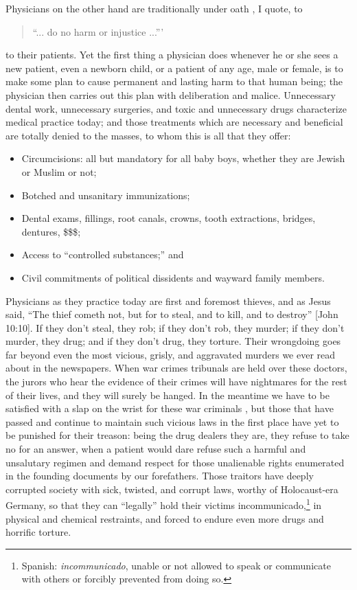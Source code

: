 \documentclass[letterpaper]{article}
\begin{document}
Physicians on the other hand are traditionally under oath \cite{north2002hippocratic}, I quote, to
\begin{quote}
``... do no harm or injustice ...''' 
\end{quote}
to their patients.  Yet the first thing a physician does whenever he or she sees a new patient, even a newborn child, or a patient of any age, male or female, is to make some plan to cause permanent and lasting harm to that human being; the physician then carries out this plan with deliberation and malice.  Unnecessary dental work, unnecessary surgeries, and toxic and unnecessary drugs characterize medical practice today; and those treatments which are necessary and beneficial are totally denied to the masses, to whom this is all that they offer:
\begin{itemize}
\itemsep0em
\item Circumcisions: all but mandatory for all baby boys, whether they are Jewish or Muslim or not;
\item Botched and unsanitary immunizations;
\item Dental exams, fillings, root canals, crowns, tooth extractions, bridges, dentures, \$\$\$;
\item Access to ``controlled substances;'' and
\item Civil commitments of political dissidents and wayward family members.
\end{itemize}
Physicians as they practice today are first and foremost thieves, and as Jesus said, ``The thief cometh not, but for to steal, and to kill, and to destroy'' [John 10:10].  If they don't steal, they rob; if they don't rob, they murder; if they don't murder, they drug; and if they don't drug, they torture.  Their wrongdoing goes far beyond even the most vicious, grisly, and aggravated murders we ever read about in the newspapers.  When war crimes tribunals are held over these doctors, the jurors who hear the evidence of their crimes will have nightmares for the rest of their lives, and they will surely be hanged.  In the meantime we have to be satisfied with a slap on the wrist for these war criminals \cite{osullivan2016western}, but those that have passed and continue to maintain such vicious laws  \cite[etc.]{rcw-10.77,rcw-71,rcw-72.06,rcw-72.23,rcw-72.27,rcw-72.25,rcw-72.29,rcw-37.12.010.4,bigfoot1969,bigfoot1984} in the first place have yet to be punished for their treason:  being the drug dealers they are, they refuse to take no for an answer, when a patient would dare refuse such a harmful and unsalutary regimen and demand respect for those unalienable rights enumerated in the founding documents  \cite{found} by our forefathers. Those traitors have deeply corrupted society with sick, twisted, and corrupt laws, worthy of Holocaust-era Germany, so that they can ``legally'' hold their victims \foreignlanguage{spanish}{incommunicado},\footnote{Spanish:  \foreignlanguage{spanish}{\textit{incommunicado}}, unable or not allowed to speak or communicate with others or forcibly prevented from doing so.} in physical and chemical restraints, and forced to endure even more drugs and horrific torture.
\end{document}

